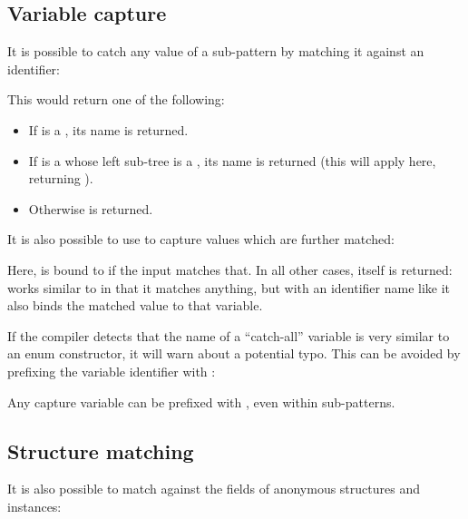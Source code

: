 \subsection{Variable capture}
\label{lf-pattern-matching-variable-capture}

It is possible to catch any value of a sub-pattern by matching it against an identifier:


This would return one of the following:

\begin{itemize}
	\item If  is a , its name is returned.
	\item If  is a  whose left sub-tree is a , its name is returned (this will apply here, returning ).
	\item Otherwise  is returned.
\end{itemize}

It is also possible to use \expr{=} to capture values which are further matched:


Here,  is bound to  if the input matches that. In all other cases,  itself is returned:  works similar to  in that it matches anything, but with an identifier name like  it also binds the matched value to that variable.


If the compiler detects that the name of a ``catch-all'' variable is very similar to an enum constructor, it will warn about a potential typo. This can be avoided by prefixing the variable identifier with :


Any capture variable can be prefixed with , even within sub-patterns.

\subsection{Structure matching}
\label{lf-pattern-matching-structure}

It is also possible to match against the fields of anonymous structures and instances:


